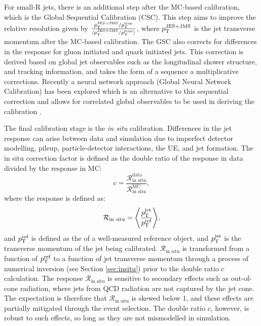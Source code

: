 For small-R jets, there is an additional step after the MC-based calibration, which is the Global Sequential Calibration (CSC). This step aims to improve the relative \pt resolution given by $\frac{p_{\text{T}}^{\text{JES+JMS}}/p_{\text{T}}^{\text{true}}}{\langle p_{\text{T}}^{\text{JES+JMS}}/p_{\text{T}}^{\text{true}}\rangle}$, where $p_{\text{T}}^{\text{JES+JMS}}$ is the jet transverse momentum after the MC-based calibration. The GSC also corrects for differences in the \pt response for gluon initiated and quark initiated jets. This correction is derived based on global jet observables such as the longitudinal shower structure, and tracking information, and takes the form of a sequence a multiplicative corrections. Recently a neural network approach (Global Neural Network Calibration) has been explored which is an alternative to this sequential correction and allows for correlated global observables to be used in deriving the calibration \cite{Atlas:smallrnewtechniques}.

The final calibration stage is the \textit{in situ} calibration. Differences in the jet response can arise between data and simulation due to imperfect detector modelling, pileup, particle-detector interactions, the UE, and jet formation. The in situ correction factor is defined as the double ratio of the response in data divided by the response in MC:
\begin{equation}
    c=\frac{\mathcal{R}^{\text{data}}_{\text{in situ}}}{\mathcal{R}^{\text{MC}}_{\text{in situ}}},
\end{equation}
where the response is defined as:
\begin{equation}
    \mathcal{R}_{\text{in situ}} = \Bigg\langle\frac{p_{\text{T}}^{\text{jet}}}{p_{\text{T}}^{\text{ref}}}\Bigg\rangle,
\end{equation}
and $p_{\text{T}}^{\text{ref}}$ is defined as the \pt of a well-measured reference object, and $p_{\text{T}}^{\text{jet}}$ is the transverse momentum of the jet being calibrated. $\mathcal{R}_{\text{in situ}}$ is transformed from a function of $p_{\text{T}}^{\text{ref}}$ to a function of jet transverse momentum through a process of numerical inversion (see Section \ref{sec:insitu}) prior to the double ratio $c$ calculation. The response $\mathcal{R}_{\text{in situ}}$ is sensitive to secondary effects such as out-of-cone radiation, where jets from QCD radiation are not captured by the jet cone. The expectation is therefore that $\mathcal{R}_{\text{in situ}}$ is skewed below 1, and these effects are partially mitigated through the event selection. The double ratio $c$, however, is robust to such effects, so long as they are not mismodelled in simulation. 

